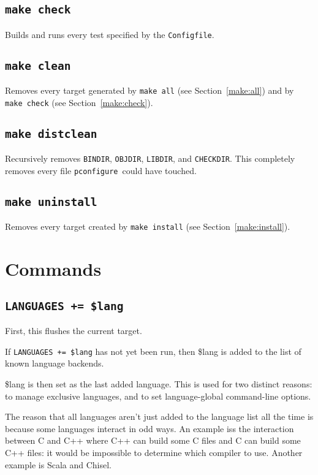\documentclass{article}
\newcommand{\pconfigure}{\texttt{pconfigure}}
\begin{document}
\subsection{\texttt{make check} \label{make:check}}

Builds and runs every test specified by the \texttt{Configfile}.

\subsection{\texttt{make clean}}

Removes every target generated by \texttt{make all} (see
Section~\ref{make:all}) and by \texttt{make check} (see
Section~\ref{make:check}).

\subsection{\texttt{make distclean}}

Recursively removes \texttt{BINDIR}, \texttt{OBJDIR}, \texttt{LIBDIR},
and \texttt{CHECKDIR}.  This completely removes every file
\pconfigure\ could have touched.

\subsection{\texttt{make uninstall}}

Removes every target created by \texttt{make install} (see
Section~\ref{make:install}).

\section{Commands \label{cmd}}

\subsection{\texttt{LANGUAGES += \$lang}}

First, this flushes the current target.

If \texttt{LANGUAGES += \$lang} has not yet been run, then \$lang is
added to the list of known language backends.

\$lang is then set as the last added language.  This is used for two
distinct reasons: to manage exclusive languages, and to set
language-global command-line options.

The reason that all languages aren't just added to the language list
all the time is because some languages interact in odd ways.  An
example iss the interaction between C and C++ where C++ can build some
C files and C can build some C++ files: it would be impossible to
determine which compiler to use.  Another example is Scala and Chisel.
\end{document}
